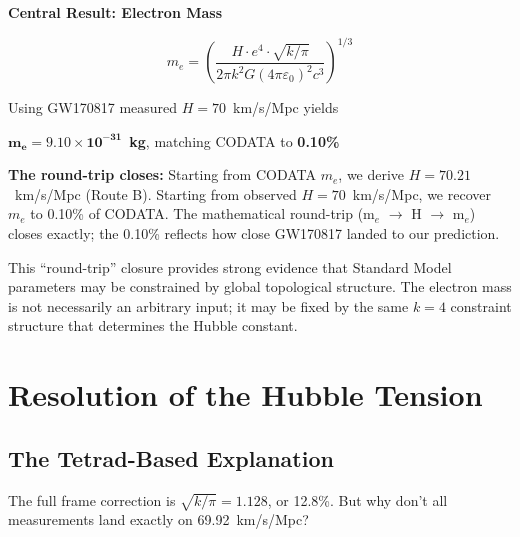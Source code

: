 \documentclass[aps,prd,preprint,superscriptaddress,showpacs,preprintnumbers,amsmath,amssymb,nofootinbib]{revtex4-2}
\begin{document}
\vspace{1em}
\noindent
\colorbox{resultgreen}{\parbox{\dimexpr\textwidth-2\fboxsep\relax}{%
\vspace{0.8em}
\centering
\textbf{\large Central Result: Electron Mass}

\vspace{0.5em}
\boldmath
\begin{equation}
m_e = \left(\frac{H \cdot e^4 \cdot \sqrt{k/\pi}}{2\pi k^2 G (4\pi\varepsilon_0)^2 c^3}\right)^{1/3}
\label{eq:electron}
\end{equation}
\unboldmath

\vspace{0.3em}
Using GW170817 measured $H = 70$~km/s/Mpc yields

$\bm{m_e = 9.10 \times 10^{-31}}$~\textbf{kg}, matching CODATA to \textbf{0.10\%}
\vspace{0.5em}
}}
\vspace{1em}

\textbf{The round-trip closes:} Starting from CODATA $m_e$, we derive $H = 70.21$~km/s/Mpc (Route B). Starting from observed $H = 70$~km/s/Mpc, we recover $m_e$ to 0.10\% of CODATA. The mathematical round-trip (m$_e$ $\to$ H $\to$ m$_e$) closes exactly; the 0.10\% reflects how close GW170817 landed to our prediction.

This ``round-trip'' closure provides strong evidence that Standard Model parameters may be constrained by global topological structure. The electron mass is not necessarily an arbitrary input; it may be fixed by the same $k=4$ constraint structure that determines the Hubble constant.

\section{Resolution of the Hubble Tension}
\label{sec:tension}

\subsection{The Tetrad-Based Explanation}
\label{subsec:tetrad-scatter}

The full frame correction is $\sqrt{k/\pi} = 1.128$, or 12.8\%. But why don't all measurements land exactly on 69.92~km/s/Mpc?
\end{document}
